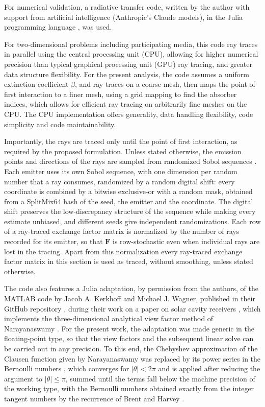 \documentclass[preprint,1p,times]{elsarticle}
\theoremstyle{plain}
\theoremstyle{definition}
\theoremstyle{remark}
\begin{document}
For numerical validation, a radiative transfer code, written by the author with support from artificial intelligence (Anthropic's Claude models), in the Julia programming language \citep{Bezanson2017}, was used. 

For two-dimensional problems including participating media, this code ray traces in parallel using the central processing unit (CPU), allowing for higher numerical precision than typical graphical processing unit (GPU) ray tracing, and greater data structure flexibility. For the present analysis, the code assumes a uniform extinction coefficient $\beta$, and ray traces on a coarse mesh, then maps the point of first interaction to a finer mesh, using a grid mapping to find the absorber indices, which allows for efficient ray tracing on arbitrarily fine meshes on the CPU. The CPU implementation offers generality, data handling flexibility, code simplicity and code maintainability.

Importantly, the rays are traced only until the point of first interaction, as required by the proposed formulation. Unless stated otherwise, the emission points and directions of the rays are sampled from randomized Sobol sequences \citep{Sobol1967, JoeKuo2008}. Each emitter uses its own Sobol sequence, with one dimension per random number that a ray consumes, randomized by a random digital shift: every coordinate is combined by a bitwise exclusive-or with a random mask, obtained from a SplitMix64 hash of the seed, the emitter and the coordinate. The digital shift preserves the low-discrepancy structure of the sequence while making every estimate unbiased, and different seeds give independent randomizations. Each row of a ray-traced exchange factor matrix is normalized by the number of rays recorded for its emitter, so that $\mathbf{F}$ is row-stochastic even when individual rays are lost in the tracing. Apart from this normalization every ray-traced exchange factor matrix in this section is used as traced, without smoothing, unless stated otherwise.

The code also features a Julia adaptation, by permission from the authors, of the MATLAB code by Jacob A. Kerkhoff and Michael J. Wagner, published in their GitHub repository \citep{Wagner2021}, during their work on a paper on solar cavity receivers \citep{Kerkhoff2021}, which implements the three-dimensional analytical view factor method of Narayanaswamy \citep{Narayanaswamy2015}. For the present work, the adaptation was made generic in the floating-point type, so that the view factors and the subsequent linear solve can be carried out in any precision. To this end, the Chebyshev approximation of the Clausen function given by Narayanaswamy was replaced by its power series in the Bernoulli numbers \citep[Eq.~27.8.2]{AbramowitzStegun1964}, which converges for $|\theta| < 2\pi$ and is applied after reducing the argument to $|\theta| \leq \pi$, summed until the terms fall below the machine precision of the working type, with the Bernoulli numbers obtained exactly from the integer tangent numbers by the recurrence of Brent and Harvey \citep{BrentHarvey2013}.
\end{document}
